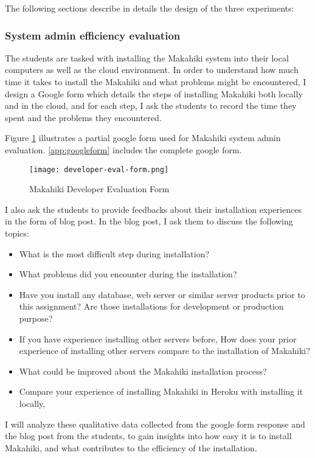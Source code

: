 The following sections describe in details the design of the three experiments:

\subsubsection{System admin efficiency evaluation}

The students are tasked with installing the Makahiki system into their local computers as well as the cloud environment. In order to understand how much time it takes to install the Makahiki and what problems might be encountered, I design a Google form which details the steps of installing Makahiki both locally and in the cloud, and for each step, I ask the students to record the time they spent and the problems they encountered.

Figure \ref{fig:developer-eval-form} illustrates a partial google form used for Makahiki system admin evaluation. \autoref{app:googleform} includes the complete google form.
\begin{figure}[ht!]
   \centering
   \texttt{[image: developer-eval-form.png]}
   \caption{Makahiki Developer Evaluation Form}
   \label{fig:developer-eval-form}
\end{figure}

I also ask the students to provide feedbacks about their installation experiences in the form of blog post. In the blog post, I ask them to discuss the following topics:
\begin{itemize}
\item What is the most difficult step during installation?
\item What problems did you encounter during the installation?
\item Have you install any database, web server or similar server products prior to this assignment? Are those installations for development or production purpose?
\item If you have experience installing other servers before, How does your prior experience of installing other servers compare to the installation of Makahiki?
\item What could be improved about the Makahiki installation process?
\item Compare your experience of installing Makahiki in Heroku with installing it locally,
\end{itemize}

I will analyze these qualitative data collected from the google form response and the blog post from the students, to gain insights into how easy it is to install Makahiki, and what contributes to the efficiency of the installation.

